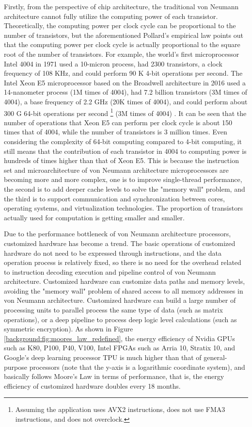 Firstly, from the perspective of chip architecture, the traditional von Neumann architecture cannot fully utilize the computing power of each transistor. Theoretically, the computing power per clock cycle can be proportional to the number of transistors, but the aforementioned Pollard's empirical law \cite{pollackpollack} points out that the computing power per clock cycle is actually proportional to the square root of the number of transistors. For example, the world's first microprocessor Intel 4004 in 1971 used a 10-micron process, had 2300 transistors, a clock frequency of 108 KHz, and could perform 90 K 4-bit operations per second. The Intel Xeon E5 microprocessor based on the Broadwell architecture in 2016 used a 14-nanometer process (1M times of 4004), had 7.2 billion transistors (3M times of 4004), a base frequency of 2.2 GHz (20K times of 4004), and could perform about 300 G 64-bit operations per second \footnote{Assuming the application uses AVX2 instructions, does not use FMA3 instructions, and does not overclock.} (3M times of 4004) \cite{intel-e5-v4}. It can be seen that the number of operations that Xeon E5 can perform per clock cycle is about 150 times that of 4004, while the number of transistors is 3 million times. Even considering the complexity of 64-bit computing compared to 4-bit computing, it still means that the contribution of each transistor in 4004 to computing power is hundreds of times higher than that of Xeon E5. This is because the instruction set and microarchitecture of von Neumann architecture microprocessors are becoming more and more complex, one is to improve single-thread performance, the second is to add deeper cache levels to solve the "memory wall" problem, and the third is to support communication and synchronization between cores, operating systems, and virtualization technologies. The proportion of transistors actually used for computation is getting smaller and smaller.

Due to the performance bottleneck of von Neumann architecture processors, customized hardware has become a trend. The basic operations of customized hardware do not need to be expressed through instructions, and the data operation process is relatively fixed, so there is no need for the overhead related to instruction decoding execution and pipeline control of von Neumann architecture. Customized hardware can customize data paths and memory levels, avoiding the "memory wall" problem of shared access to all memory addresses in von Neumann architecture. Customized hardware can build a large number of processing units to parallel process the same type of data (such as matrix operations), or a deep pipeline to process deep logic level calculations (such as symmetric encryption). As shown in Figure \ref{background:fig:moores_law_redefined}, the energy efficiency of Nvidia GPUs such as K80, P100, P40, V100, Intel FPGAs such as Arria 10, Stratix 10, and Google's deep learning processor TPU is much higher than that of general-purpose processors (note that the y-axis is a logarithmic coordinate system), and basically follows Moore's Law in terms of performance, that is, the energy efficiency of customized hardware doubles every 18 months.

